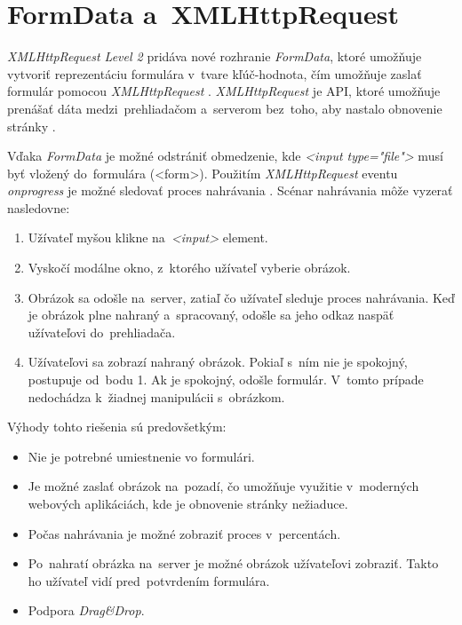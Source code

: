 \section{FormData a~XMLHttpRequest}

\emph{XMLHttpRequest Level 2} pridáva nové rozhranie \emph{FormData}, ktoré umožňuje vytvoriť reprezentáciu formulára v~tvare kľúč-hodnota, čím umožňuje zaslať formulár pomocou \emph{XMLHttpRequest} \cite{MDN_Formdata}. \emph{XMLHttpRequest} je API, ktoré umožňuje prenášať dáta medzi~prehliadačom a~serverom bez~toho, aby nastalo obnovenie stránky \cite{MDN_XMLHttpRequest}.

Vďaka \emph{FormData} je možné odstrániť obmedzenie, kde \emph{<input type="file"\textgreater} musí byť vložený do~formulára (<form\textgreater). Použitím \emph{XMLHttpRequest} eventu \emph{onprogress} je možné sledovať proces nahrávania \cite{MDN_XMLHttpRequest_progress}. Scénar nahrávania môže vyzerať nasledovne:
\begin{enumerate}
	\item Užívateľ myšou klikne na~\emph{<input>} element.
	\item Vyskočí modálne okno, z~ktorého užívateľ vyberie obrázok.
	\item Obrázok sa odošle na~server, zatiaľ čo užívateľ sleduje proces nahrávania. Keď je obrázok plne nahraný a~spracovaný, odošle sa jeho odkaz naspäť užívateľovi do~prehliadača.
	\item Užívateľovi sa zobrazí nahraný obrázok. Pokiaľ s~ním nie je spokojný, postupuje od~bodu 1. Ak je spokojný, odošle formulár. V~tomto prípade nedochádza k~žiadnej manipulácii s~obrázkom.
\end{enumerate}

Výhody tohto riešenia sú predovšetkým:
\begin{itemize}
	\item Nie je potrebné umiestnenie vo formulári.
	\item Je možné zaslať obrázok na~pozadí, čo umožňuje využitie v~moderných webových aplikáciách, kde je obnovenie stránky nežiaduce.
	\item Počas nahrávania je možné zobraziť proces v~percentách.
	\item Po~nahratí obrázka na~server je možné obrázok užívateľovi zobraziť. Takto ho užívateľ vidí pred~potvrdením formulára.
	\item Podpora \emph{Drag\&Drop}.
\end{itemize}

